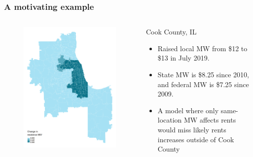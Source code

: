 \documentclass[aspectratio=169, t]{beamer}
\begin{document}
\begin{frame}
    \frametitle{A motivating example}
    \begin{columns}
        \begin{column}{0.44\textwidth}
            \vspace{-8mm}
            \begin{figure}
                \centering
                \includegraphics[scale = 0.39]{maps_events/output/chicago_2019-6_statutory_mw.png}
            \end{figure}   
        \end{column}
        \begin{column}{0.56\textwidth}
            Cook County, IL
            \begin{itemize}
                \item Raised local MW from \$12 to \$13 in July 2019. 
                \item State MW is \$8.25 since 2010, and federal MW is \$7.25 since 2009.
                \vspace{2mm}
                \pause
                \item A model where only same-location MW affects rents 
                would miss likely rents increases outside of Cook County
            \end{itemize}
        \end{column}
    \end{columns}
\end{frame}
\end{document}
